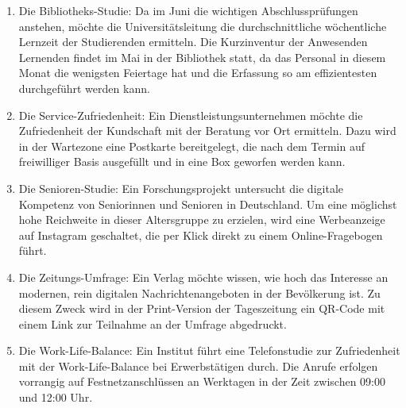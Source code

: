 \begin{enumerate}
\item
Die Bibliotheks-Studie: Da im Juni die wichtigen Abschlussprüfungen anstehen, möchte die
    Universitätsleitung die durchschnittliche wöchentliche Lernzeit der Studierenden ermitteln.
    Die Kurzinventur der Anwesenden Lernenden findet im Mai in der Bibliothek statt, da das Personal in diesem Monat die wenigsten
    Feiertage hat und die Erfassung so am effizientesten durchgeführt werden kann. 

\item
    Die Service-Zufriedenheit: Ein Dienstleistungsunternehmen möchte die Zufriedenheit der
    Kundschaft mit der Beratung vor Ort ermitteln. Dazu wird in der Wartezone eine Postkarte bereitgelegt,
    die nach dem Termin auf freiwilliger Basis ausgefüllt und in eine Box geworfen werden kann. 

\item
Die Senioren-Studie: Ein Forschungsprojekt untersucht die digitale Kompetenz von Seniorinnen
    und Senioren in Deutschland. Um eine möglichst hohe Reichweite in dieser Altersgruppe zu erzielen,
    wird eine Werbeanzeige auf Instagram geschaltet, die per Klick direkt zu einem Online-Fragebogen führt. 

\item
Die Zeitungs-Umfrage: Ein Verlag möchte wissen, wie hoch das Interesse an modernen, rein digitalen
    Nachrichtenangeboten in der Bevölkerung ist. Zu diesem Zweck wird in der Print-Version
    der Tageszeitung ein QR-Code mit einem Link zur Teilnahme an der Umfrage abgedruckt. 

\item
Die Work-Life-Balance: Ein Institut führt eine Telefonstudie zur Zufriedenheit mit der Work-Life-Balance
    bei Erwerbstätigen durch. Die Anrufe erfolgen vorrangig auf Festnetzanschlüssen an Werktagen in der
    Zeit zwischen 09:00 und 12:00 Uhr. 


\end{enumerate}
